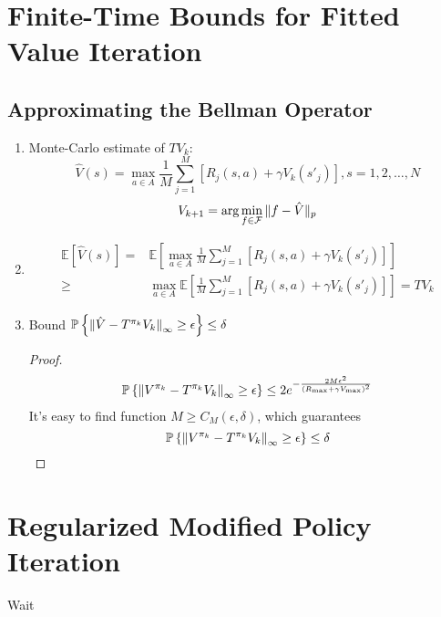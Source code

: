 \documentclass[a4paper]{article}
\begin{document}
\section{Finite-Time Bounds for Fitted Value Iteration}%

\subsection{Approximating the Bellman Operator}%

\begin{enumerate}
    \item Monte-Carlo estimate of $ TV_k $:
        \[
             \hat V(s) = \max_{a \in A} \frac{1}{M} \sum^{M}_{j=1} \left[ R_j(s, a) + \gamma V_k(s'_j) \right], s = 1, 2, \ldots, N
        \]
        \[
            V_{k+1} = \arg\min_{f \in \mathcal{F}} \Arrowvert f - \hat V \Arrowvert_p
        \]
    \item 
        \begin{align*}
            \mathbb{E}\left[ \hat V(s) \right] =& \mathbb{E}\left[ \max_{a \in A} \frac{1}{M} \sum^{M}_{j=1} \left[ R_j(s, a) + \gamma V_k(s'_j) \right] \right] \\
            \ge& \max_{a \in A} \mathbb{E} \left[ \frac{1}{M} \sum^{M}_{j=1} \left[ R_j(s,a) + \gamma V_k(s'_j) \right] \right] = TV_k
        \end{align*}
    \item Bound $ \mathbb{P} \left\{ {\Arrowvert \hat V - T^{\pi_k}V_k \Arrowvert}_\infty \ge \epsilon\right\} \le \delta $
        \begin{proof}
            \begin{align*}
                \mathbb{P} \left\{ {\Arrowvert V^{\pi_k} - T^{\pi_k}V_k \Arrowvert}_\infty \ge \epsilon \right\}
                \le 2 e^{-\frac{2M \epsilon^2}{{(R_{\max} + \gamma V_{\max})}^2} }
            \end{align*}
            It's easy to find function $ M \ge C_M(\epsilon, \delta) $, which guarantees
            \[
                 \mathbb{P} \left\{ {\Arrowvert V^{\pi_k} - T^{\pi_k}V_k \Arrowvert}_\infty \ge \epsilon \right\} \le \delta
            \]
        \end{proof}
\end{enumerate}


\section{Regularized Modified Policy Iteration}%
Wait
\end{document}
